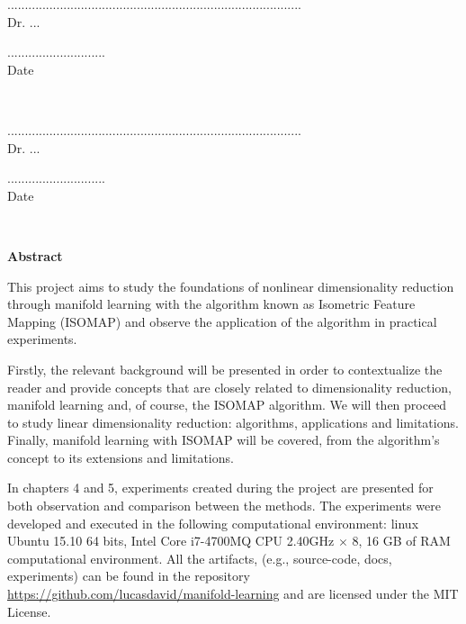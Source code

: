 \documentclass[12pt]{report}
\begin{document}
\begin{minipage}{.7\linewidth}
	....................................................................................\\
	Dr. ...
\end{minipage}%
\begin{minipage}{.3\linewidth}
	\begin{flushright}
		............................\\
		Date
	\end{flushright}
\end{minipage}\\[1.5cm]

\begin{minipage}{.7\linewidth}
	....................................................................................\\
	Dr. ...
\end{minipage}%
\begin{minipage}{.3\linewidth}
	\begin{flushright}
		............................\\
		Date
	\end{flushright}
\end{minipage}\\[3cm]

\newpage
\begin{center}
	\textbf{Abstract}
\end{center}

This project aims to study the foundations of nonlinear dimensionality reduction through manifold learning with the algorithm known as Isometric Feature Mapping (ISOMAP) and observe the application of the algorithm in practical experiments.

Firstly, the relevant background will be presented in order to contextualize the reader and provide concepts that are closely related to dimensionality reduction, manifold learning and, of course, the ISOMAP algorithm. We will then proceed to study linear dimensionality reduction: algorithms, applications and limitations. Finally, manifold learning with ISOMAP will be covered, from the algorithm's concept to its extensions and limitations.

In chapters 4 and 5, experiments created during the project are presented for both observation and comparison between the methods. The experiments were developed and executed in the following computational environment: linux Ubuntu 15.10 64 bits, Intel Core i7-4700MQ CPU 2.40GHz $\times$ 8, 16 GB of RAM computational environment. All the artifacts, (e.g., source-code, docs, experiments) can be found in the repository \url{https://github.com/lucasdavid/manifold-learning} and are licensed under the MIT License.
\end{document}
